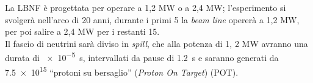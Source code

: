 \documentclass[../../main.tex]{subfiles}
\begin{document}
  La LBNF è progettata per operare a 1,2 MW o a 2,4 MW; l'esperimento si
  svolgerà nell'arco di 20 anni, durante i primi 5 la \textit{beam line}
  opererà a 1,2 MW, per poi salire a 2,4 MW per i restanti 15.\\
  Il fascio di neutrini sarà diviso in \textit{spill}, che alla potenza di 1,
  2 MW avranno una durata di \SI{e-5}{\second}, intervallati da pause di
  \SI{1,2}{\second} e saranno generati da \num{7,5e15} ``protoni su
  bersaglio'' (\textit{Proton On Target}) (POT).
\end{document}
